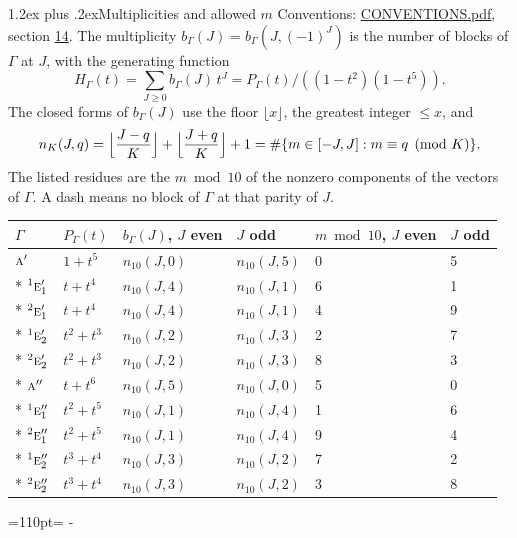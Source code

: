 \documentclass[10pt,a4paper]{article}
\makeatletter
\renewcommand\section{\@startsection{section}{1}{\z@}{-3ex plus -1ex minus -.2ex}%
  {1.2ex plus .2ex}{\normalfont\large\sffamily\bfseries\color{parttitle}}}
\newcommand{\needspace}[1]{\par\penalty-100\begingroup\dimen0=#1\relax\dimen2=\pagegoal
  \advance\dimen2-\pagetotal\ifdim\dimen0>\dimen2\relax\ifdim\dimen2>0pt\vfil\break\fi\fi
  \endgroup}
\numberwithin{equation}{section}
\newcommand{\irr}[1]{\text{\normalfont\scshape #1}}
\newcommand{\conjpair}[1]{{}^{#1}}
\makeatother
\begin{document}
\section{Multiplicities and allowed \texorpdfstring{$m$}{m}}\label{s:multiplicities}
Conventions: \href{../../CONVENTIONS.pdf}{CONVENTIONS.pdf}, section \href{../../CONVENTIONS.pdf\#conv.14}{14}.
\leavevmode\label{n:function.generating}\label{n:index.generating.variable}\label{n:function.generating.numerator}The multiplicity $b_\Gamma(J) = b_\Gamma(J, (-1)^J)$ is the number of blocks of $\Gamma$ at $J$, with the generating function
\begin{equation}\label{e:gf}H_\Gamma(t) = \sum_{J\ge0} b_\Gamma(J)\,t^J = P_\Gamma(t)/((1-t^{2})(1-t^{5})).\end{equation}
\leavevmode\label{n:delimiter.floor}\label{n:local.floor.x}\label{n:function.count}\label{n:index.modulus.K}\label{n:index.residue}The closed forms of $b_\Gamma(J)$ use the floor $\lfloor x\rfloor$, the greatest integer $\le x$, and
\begin{equation}\label{e:count}n_K(J,q) = \Bigl\lfloor\frac{J-q}{K}\Bigr\rfloor + \Bigl\lfloor\frac{J+q}{K}\Bigr\rfloor + 1 = \#\{m\in[-J,J] : m\equiv q \pmod{K}\}.\end{equation}
\leavevmode\label{n:head.parity}The listed residues are the $m \bmod 10$ of the nonzero components of the vectors of $\Gamma$. A dash means no block of $\Gamma$ at that parity of $J$.
{\small\begin{longtable}{@{}llllll@{}}\toprule
$\Gamma$ & $P_\Gamma(t)$ & $b_\Gamma(J)$, $J$ even & $J$ odd & $m \bmod 10$, $J$ even & $J$ odd\\\midrule\endhead
\bottomrule\endfoot\endlastfoot
$\irr{a}'$ & $1 + t^{5}$ & $n_{10}(J,0)$ & $n_{10}(J,5)$ & 0 & 5\\*
$\conjpair{1}\irr{e}_{1}'$ & $t + t^{4}$ & $n_{10}(J,4)$ & $n_{10}(J,1)$ & 6 & 1\\*
$\conjpair{2}\irr{e}_{1}'$ & $t + t^{4}$ & $n_{10}(J,4)$ & $n_{10}(J,1)$ & 4 & 9\\*
$\conjpair{1}\irr{e}_{2}'$ & $t^{2} + t^{3}$ & $n_{10}(J,2)$ & $n_{10}(J,3)$ & 2 & 7\\*
$\conjpair{2}\irr{e}_{2}'$ & $t^{2} + t^{3}$ & $n_{10}(J,2)$ & $n_{10}(J,3)$ & 8 & 3\\*
$\irr{a}''$ & $t + t^{6}$ & $n_{10}(J,5)$ & $n_{10}(J,0)$ & 5 & 0\\*
$\conjpair{1}\irr{e}_{1}''$ & $t^{2} + t^{5}$ & $n_{10}(J,1)$ & $n_{10}(J,4)$ & 1 & 6\\*
$\conjpair{2}\irr{e}_{1}''$ & $t^{2} + t^{5}$ & $n_{10}(J,1)$ & $n_{10}(J,4)$ & 9 & 4\\*
$\conjpair{1}\irr{e}_{2}''$ & $t^{3} + t^{4}$ & $n_{10}(J,3)$ & $n_{10}(J,2)$ & 7 & 2\\*
$\conjpair{2}\irr{e}_{2}''$ & $t^{3} + t^{4}$ & $n_{10}(J,3)$ & $n_{10}(J,2)$ & 3 & 8\\
\bottomrule\end{longtable}}
\needspace{110pt}
\end{document}
